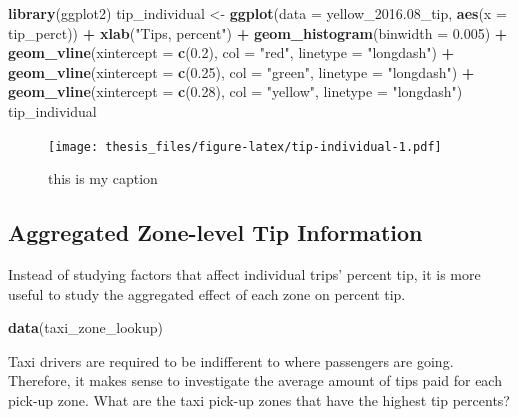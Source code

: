 \documentclass[12pt,twoside]{reedthesis}
\newenvironment{Shaded}{\begin{snugshade}}{\end{snugshade}}
\newcommand{\KeywordTok}[1]{\textcolor[rgb]{0.13,0.29,0.53}{\textbf{#1}}}
\newcommand{\DataTypeTok}[1]{\textcolor[rgb]{0.13,0.29,0.53}{#1}}
\newcommand{\FloatTok}[1]{\textcolor[rgb]{0.00,0.00,0.81}{#1}}
\newcommand{\StringTok}[1]{\textcolor[rgb]{0.31,0.60,0.02}{#1}}
\newcommand{\OperatorTok}[1]{\textcolor[rgb]{0.81,0.36,0.00}{\textbf{#1}}}
\newcommand{\NormalTok}[1]{#1}
\theoremstyle{definition}
\theoremstyle{definition}
\theoremstyle{definition}
\theoremstyle{remark}
\begin{document}
\begin{Shaded}
\begin{Highlighting}[]
\KeywordTok{library}\NormalTok{(ggplot2)}
\NormalTok{tip_individual <-}\StringTok{ }\KeywordTok{ggplot}\NormalTok{(}\DataTypeTok{data =}\NormalTok{ yellow_}\FloatTok{2016.}\NormalTok{08_tip, }
    \KeywordTok{aes}\NormalTok{(}\DataTypeTok{x =}\NormalTok{ tip_perct)) }\OperatorTok{+}\StringTok{ }\KeywordTok{xlab}\NormalTok{(}\StringTok{"Tips, percent"}\NormalTok{) }\OperatorTok{+}\StringTok{ }\KeywordTok{geom_histogram}\NormalTok{(}\DataTypeTok{binwidth =} \FloatTok{0.005}\NormalTok{) }\OperatorTok{+}\StringTok{ }
\StringTok{    }\KeywordTok{geom_vline}\NormalTok{(}\DataTypeTok{xintercept =} \KeywordTok{c}\NormalTok{(}\FloatTok{0.2}\NormalTok{), }\DataTypeTok{col =} \StringTok{"red"}\NormalTok{, }\DataTypeTok{linetype =} \StringTok{"longdash"}\NormalTok{) }\OperatorTok{+}\StringTok{ }
\StringTok{    }\KeywordTok{geom_vline}\NormalTok{(}\DataTypeTok{xintercept =} \KeywordTok{c}\NormalTok{(}\FloatTok{0.25}\NormalTok{), }\DataTypeTok{col =} \StringTok{"green"}\NormalTok{, }
        \DataTypeTok{linetype =} \StringTok{"longdash"}\NormalTok{) }\OperatorTok{+}\StringTok{ }\KeywordTok{geom_vline}\NormalTok{(}\DataTypeTok{xintercept =} \KeywordTok{c}\NormalTok{(}\FloatTok{0.28}\NormalTok{), }
    \DataTypeTok{col =} \StringTok{"yellow"}\NormalTok{, }\DataTypeTok{linetype =} \StringTok{"longdash"}\NormalTok{)}
\NormalTok{tip_individual}
\end{Highlighting}
\end{Shaded}
\begin{figure}
\centering
\texttt{[image: thesis\_files/figure-latex/tip-individual-1.pdf]}
\caption{\label{fig:tip-individual}this is my caption}
\end{figure}
\subsection{Aggregated Zone-level Tip
Information}\label{aggregated-zone-level-tip-information}

Instead of studying factors that affect individual trips' percent tip,
it is more useful to study the aggregated effect of each zone on percent
tip.
\begin{Shaded}
\begin{Highlighting}[]
\KeywordTok{data}\NormalTok{(taxi_zone_lookup)}
\end{Highlighting}
\end{Shaded}
Taxi drivers are required to be indifferent to where passengers are
going. Therefore, it makes sense to investigate the average amount of
tips paid for each pick-up zone. What are the taxi pick-up zones that
have the highest tip percents?
\end{document}
